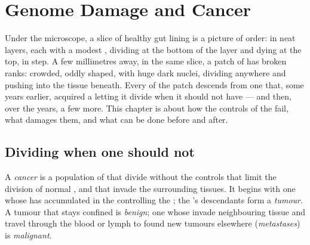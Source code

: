 \chapter{Genome Damage and Cancer}\label{ch:g11:cancer}

Under the microscope, a slice of healthy gut lining is a picture of
order:  in neat layers, each with a modest , dividing at
the bottom of the layer and dying at the top, in step. A few
millimetres away, in the same slice, a patch of  has broken ranks:
crowded, oddly shaped, with huge dark nuclei, dividing anywhere and
pushing into the tissue beneath. Every  of the patch descends from
one  that, some years earlier, acquired a  letting it
divide when it should not have --- and then, over the years, a few
more. This chapter is about how the controls of the  fail,
what damages them, and what can be done before and after.

\section{Dividing when one should not}

\begin{definition}[Cancer]\label{def:g11:cancer:cancer}
A \emph{cancer} is a population of  that divide
without the controls that limit the division of normal , and
that invade the surrounding tissues. It begins with one  whose
 has accumulated  in the  controlling the ; the 's descendants form a \emph{tumour}. A
tumour that stays confined is \emph{benign}; one whose  invade
neighbouring tissue and travel through the blood or lymph to found
new tumours elsewhere (\emph{metastases}) is \emph{malignant}.
\end{definition}

